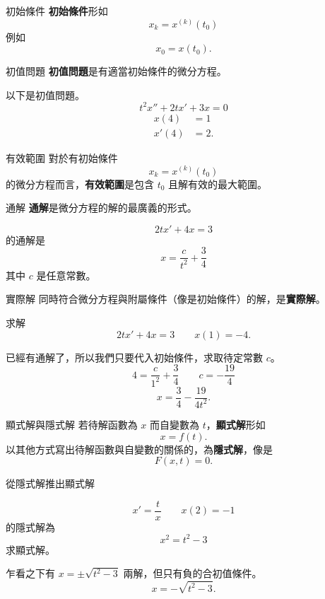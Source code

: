 \documentclass{beamer}
\theoremstyle{remark}
\begin{document}
\begin{CJK}{UTF8}{bsmi}
\begin{frame}{初始條件}
  \textbf{初始條件}形如
  \[ x_k = x^{(k)}(t_0) \]
  例如
  \[ x_0 = x(t_0).\]
\end{frame}

\begin{frame}{初值問題}
  \textbf{初值問題}是有適當初始條件的微分方程。
  \begin{example}
    以下是初值問題。
    \[ t^2 x'' + 2t x' + 3x = 0 \]
    \begin{align*}
      x (4) &= 1 \\
      x'(4) &= 2.
    \end{align*}
  \end{example}
\end{frame}

\begin{frame}{有效範圍}
  對於有初始條件
  \[ x_k = x^{(k)}(t_0) \]
  的微分方程而言，\textbf{有效範圍}是包含 $t_0$ 且解有效的最大範圍。
\end{frame}

\begin{frame}{通解}
  \textbf{通解}是微分方程的解的最廣義的形式。
  \begin{example}
    \[ 2tx' + 4x = 3 \]
    的通解是
    \[ x = \frac{c}{t^2} + \frac34 \]
    其中 $c$ 是任意常數。
  \end{example}
\end{frame}

\begin{frame}{實際解}
  同時符合微分方程與附屬條件（像是初始條件）的解，是\textbf{實際解}。
  \begin{example}
    求解
    \[ 2tx' + 4x = 3 \qquad x(1) = -4.\]
    \begin{solution}
      已經有通解了，所以我們只要代入初始條件，求取待定常數 $c$。
      \[ 4 = \frac{c}{1^2} + \frac34 \qquad c = -\frac{19}{4} \]
      \[ x = \frac34 - \frac{19}{4t^2}. \]
    \end{solution}
  \end{example}
\end{frame}

\begin{frame}{顯式解與隱式解}
  若待解函數為 $x$ 而自變數為 $t$，\textbf{顯式解}形如
  \[ x = f(t).\]
  以其他方式寫出待解函數與自變數的關係的，為\textbf{隱式解}，像是
  \[ F(x,t) = 0.\]
\end{frame}

\begin{frame}{從隱式解推出顯式解}
  \begin{example}
    \[ x' = \frac{t}{x} \qquad x(2) = -1 \]
    的隱式解為
    \[ x^2 = t^2 - 3 \]
    求顯式解。
    \begin{solution}
      乍看之下有 $x = \pm\sqrt{t^2 - 3}$ 兩解，但只有負的合初值條件。
      \[ x = -\sqrt{t^2 - 3}.\]
    \end{solution}
  \end{example}
\end{frame}


\end{CJK}
\end{document}
